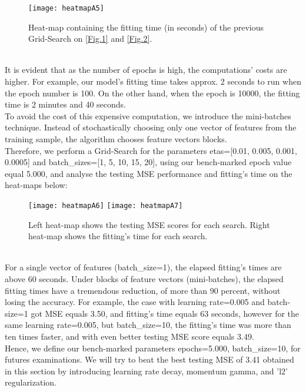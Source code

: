 \begin{figure}[H]
\label{fig:figA3}
\centering
\texttt{[image: heatmapA5]}
\caption{Heat-map containing the fitting time (in seconds) of the previous Grid-Search on \hyperref[fig:figA1]{[Fig.1]} and \hyperref[fig:figA2]{[Fig.2]}.}
\end{figure}\\

It is evident that as the number of epochs is high, the computations' costs are higher. For example, our model's fitting time takes approx. 2 seconds to run when the epoch number is 100. On the other hand, when the epoch is 10000, the fitting time is 2 minutes and 40 seconds.\\

To avoid the cost of this expensive computation, we introduce the mini-batches technique. Instead of stochastically choosing only one vector of features from the training sample, the algorithm chooses feature vectors blocks.\\

Therefore, we perform a Grid-Search for the parameters etas=[0.01, 0.005, 0.001, 0.0005] and batch\_sizes=[1, 5, 10, 15, 20], using our bench-marked epoch value equal 5.000, and analyse the testing MSE performance and fitting's time on the heat-maps below:\\

\begin{figure}[H]
\label{fig:figA4}
\centering
\texttt{[image: heatmapA6]}
\texttt{[image: heatmapA7]}
\caption{Left heat-map shows the testing MSE scores for each search. Right heat-map shows the fitting's time for each search.}
\end{figure}\\

For a single vector of features (batch\_size=1), the elapsed fitting's times are above 60 seconds. Under blocks of feature vectors (mini-batches), the elapsed fitting times have a tremendous reduction, of more than 90 percent, without losing the accuracy. For example, the case with learning rate=0.005 and batch-size=1 got MSE equals 3.50, and fitting's time equals 63 seconds, however for the same learning rate=0.005, but batch\_size=10, the fitting's time was more than ten times faster, and with even better testing MSE score equals 3.49.\\

Hence, we define our bench-marked parameters epochs=5.000, batch\_size=10, for futures examinations. We will try to beat the best testing MSE of 3.41 obtained in this section by introducing learning rate decay, momentum gamma, and 'l2' regularization.\\


